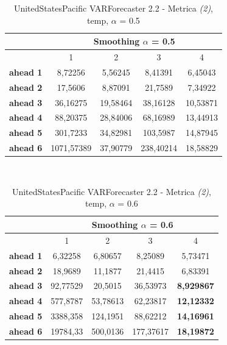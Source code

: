 \documentclass[12pt,a4paper,oneside,openright]{book}
\begin{document}
\medskip

\begin{table}[H]
\centering
\begin{tabular}{|c|c|c|c|c|}
\hline
 & \multicolumn{4}{|c|}{Smoothing $\alpha$ = 0.5} \\
\hline
& 1 & 2 & 3 & 4 \\
\hline
\textbf{ahead 1} & 8,72256 & 5,56245 & 8,41391 & 6,45043\\
\hline
\textbf{ahead 2} & 17,5606 & 8,87091 & 21,7589 & 7,34922\\ 
\hline
\textbf{ahead 3} & 36,16275 & 19,58464 & 38,16128 & 10,53871\\
\hline
\textbf{ahead 4} & 88,20375 & 28,84006 & 68,16989 &13,44913\\ 
\hline
\textbf{ahead 5} & 301,7233 & 34,82981 & 103,5987 & 14,87945\\
\hline
\textbf{ahead 6} & 1071,57389 & 37,90779 & 238,40214 &18,58829\\ 
\hline
\end{tabular} \\
\caption{UnitedStatesPacific VARForecaster 2.2 - Metrica \textit{(2)}, temp, $\alpha$ = 0.5}
\end{table}

\medskip

\begin{table}[H]
\centering
\begin{tabular}{|c|c|c|c|c|}
\hline
 & \multicolumn{4}{|c|}{Smoothing $\alpha$ = 0.6} \\
\hline
& 1 & 2 & 3 & 4 \\
\hline
\textbf{ahead 1} & 6,32258 & 6,80657 & 8,25089 & 5,73471\\
\hline
\textbf{ahead 2} & 18,9689 & 11,1877 & 21,4415 & 6,83391\\ 
\hline
\textbf{ahead 3} & 92,77529 & 20,5015 & 36,53973 & \textbf{8,929867}\\
\hline
\textbf{ahead 4} & 577,8787 & 53,78613 & 62,23817 & \textbf{12,12332}\\ 
\hline
\textbf{ahead 5} & 3388,358 & 124,1951 & 88,62212 & \textbf{14,16961}\\
\hline
\textbf{ahead 6} & 19784,33 & 500,0136 & 177,37617 & \textbf{18,19872}\\ 
\hline
\end{tabular} \\
\caption{UnitedStatesPacific VARForecaster 2.2 - Metrica \textit{(2)}, temp, $\alpha$ = 0.6}
\end{table}
\end{document}
